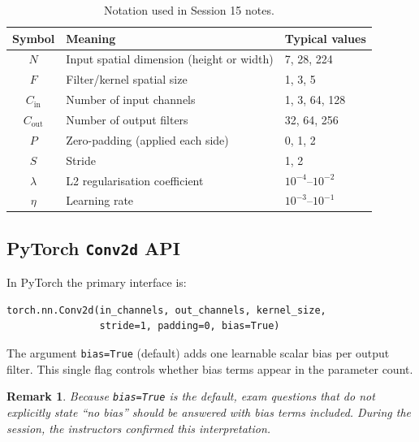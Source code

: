 \documentclass[12pt,a4paper]{article}
\newtheorem{remark}{Remark}[section]
\newcommand{\Cin}{C_{\mathrm{in}}}
\newcommand{\Cout}{C_{\mathrm{out}}}
\begin{document}
\begin{table}[ht]
  \centering
  \caption{Notation used in Session 15 notes.}
  \label{tab:notation}
  \begin{tabular}{@{}cll@{}}
    \toprule
    Symbol & Meaning & Typical values \\
    \midrule
    $N$     & Input spatial dimension (height or width) & 7, 28, 224 \\
    $F$     & Filter/kernel spatial size                & 1, 3, 5    \\
    $\Cin$  & Number of input channels                  & 1, 3, 64, 128 \\
    $\Cout$ & Number of output filters                  & 32, 64, 256 \\
    $P$     & Zero-padding (applied each side)          & 0, 1, 2 \\
    $S$     & Stride                                    & 1, 2 \\
    $\lambda$ & L2 regularisation coefficient           & $10^{-4}$--$10^{-2}$ \\
    $\eta$  & Learning rate                             & $10^{-3}$--$10^{-1}$ \\
    \bottomrule
  \end{tabular}
\end{table}

\subsection{PyTorch \texttt{Conv2d} API}

In PyTorch the primary interface is:

\begin{verbatim}
torch.nn.Conv2d(in_channels, out_channels, kernel_size,
                stride=1, padding=0, bias=True)
\end{verbatim}

The argument \texttt{bias=True} (default) adds one learnable scalar bias per
output filter. This single flag controls whether bias terms appear in the
parameter count.

\begin{remark}
\label{rem:bias_default}
Because \texttt{bias=True} is the default, exam questions that do not
explicitly state ``no bias'' should be answered \emph{with} bias terms
included. During the session, the instructors confirmed this interpretation.
\end{remark}

\end{document}
